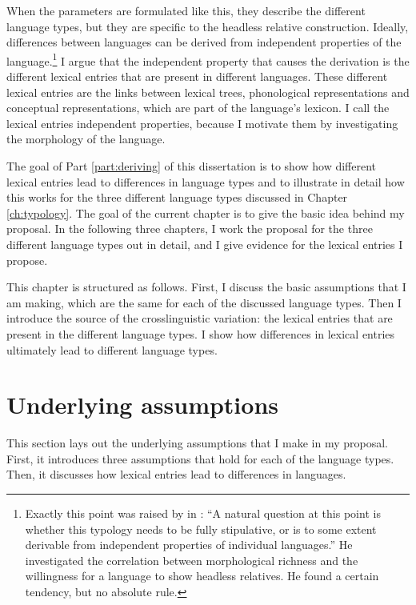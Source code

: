 When the parameters are formulated like this, they describe the different language types, but they are specific to the headless relative construction. Ideally, differences between languages can be derived from independent properties of the language.\footnote{
Exactly this point was raised by in \citet[][147]{grosu1994}:
``A natural question at this point is whether this typology needs to be fully stipulative, or is to some extent derivable from independent properties of individual languages.''
He investigated the correlation between morphological richness and the willingness for a language to show headless relatives. He found a certain tendency, but no absolute rule.
}
I argue that the independent property that causes the derivation is the different lexical entries that are present in different languages. These different lexical entries are the links between lexical trees, phonological representations and conceptual representations, which are part of the language's lexicon.
I call the lexical entries independent properties, because I motivate them by investigating the morphology of the language.

The goal of Part \ref{part:deriving} of this dissertation is to show how different lexical entries lead to differences in language types and to illustrate in detail how this works for the three different language types discussed in Chapter \ref{ch:typology}. The goal of the current chapter is to give the basic idea behind my proposal. In the following three chapters, I work the proposal for the three different language types out in detail, and I give evidence for the lexical entries I propose.

This chapter is structured as follows.
First, I discuss the basic assumptions that I am making, which are the same for each of the discussed language types. Then I introduce the source of the crosslinguistic variation: the lexical entries that are present in the different language types. I show how differences in lexical entries ultimately lead to different language types.


\section{Underlying assumptions}\label{sec:assumptions}

This section lays out the underlying assumptions that I make in my proposal. First, it introduces three assumptions that hold for each of the language types. Then, it discusses how lexical entries lead to differences in languages.


